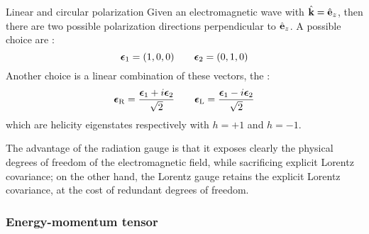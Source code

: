 \begin{example}{Linear and circular polarization}{}
  Given an electromagnetic wave with $ \hat{\mathbf{k}} = \hat{\mathbf{e}}_z $, then there are two possible polarization directions perpendicular to $ \hat{\mathbf{e}}_z $. A possible choice are :
  \begin{equation}
    \boldsymbol{\epsilon}_1 = (1, 0, 0)
    \qquad
    \boldsymbol{\epsilon}_2 = (0, 1, 0)
  \end{equation}
  Another choice is a linear combination of these vectors, the :
  \begin{equation}
    \boldsymbol{\epsilon}_\text{R} = \frac{\boldsymbol{\epsilon}_1 + i \boldsymbol{\epsilon}_2}{\sqrt{2}}
    \qquad
    \boldsymbol{\epsilon}_\text{L} = \frac{\boldsymbol{\epsilon}_1 - i \boldsymbol{\epsilon}_2}{\sqrt{2}}
    \label{eq:circ-pol-vec}
  \end{equation}
  which are helicity eigenstates respectively with $ h = +1 $ and $ h = -1 $.
\end{example}

The advantage of the radiation gauge is that it exposes clearly the physical degrees of freedom of the electromagnetic field, while sacrificing explicit Lorentz covariance; on the other hand, the Lorentz gauge retains the explicit Lorentz covariance, at the cost of redundant degrees of freedom.

\subsubsection{Energy-momentum tensor}

